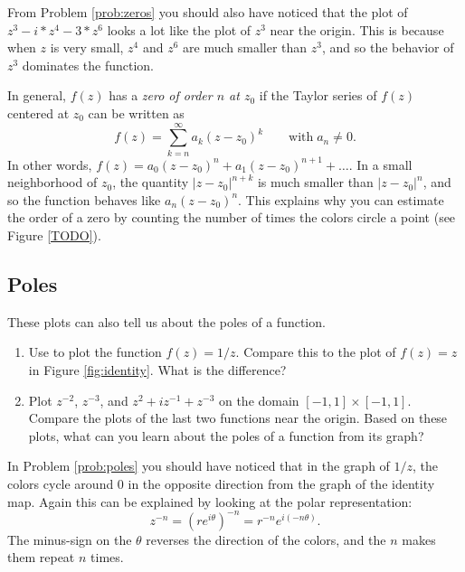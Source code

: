 From Problem \ref{prob:zeros} you should also have noticed that the plot of $z^3 - i*z^4 - 3*z^6$ looks a lot like the plot of $z^3$ near the origin.
This is because when $z$ is very small, $z^4$ and $z^6$ are much smaller than $z^3$, and so the behavior of $z^3$ dominates the function.

In general, $f(z)$ has a \emph{zero of order $n$ at $z_0$} if the Taylor series of $f(z)$ centered at $z_0$ can be written as 
\[
f(z) = \sum_{k=n}^{\infty} a_k(z-z_0)^k \qquad \text{with} \; a_n \neq 0.
\]
In other words, $f(z) = a_0(z-z_0)^n + a_1(z-z_0)^{n+1} + \ldots$. 
In a small neighborhood of $z_0$, the quantity $|z-z_0|^{n+k}$ is much smaller than $|z-z_0|^n$, and so the function behaves like $a_n(z-z_0)^n$.
This explains why you can estimate the order of a zero by counting the number of times the colors circle a point (see Figure \ref{TODO}).


\subsection*{Poles}

These plots can also tell us about the poles of a function.

\begin{problem}\label{prob:poles}
\leavevmode
\begin{enumerate}
\item Use  to plot the function $f(z) = 1/z$. 
Compare this to the plot of $f(z)=z$ in Figure \ref{fig:identity}.
What is the difference?
\item Plot $z^{-2}$, $z^{-3}$, and $z^2+iz^{-1}+z^{-3}$ on the domain $[-1,1] \times [-1,1]$. 
Compare the plots of the last two functions near the origin.
Based on these plots, what can you learn about the poles of a function from its graph?
\end{enumerate}
\end{problem}

In Problem \ref{prob:poles} you should have noticed that in the graph of $1/z$, the colors cycle around 0 in the opposite direction from the graph of the identity map.
Again this can be explained by looking at the polar representation:
\[
z^{-n} = (re^{i \theta})^{-n} = r^{-n} e^{i(-n\theta)}.
\]
The minus-sign on the $\theta$ reverses the direction of the colors, and the $n$ makes them repeat $n$ times.

